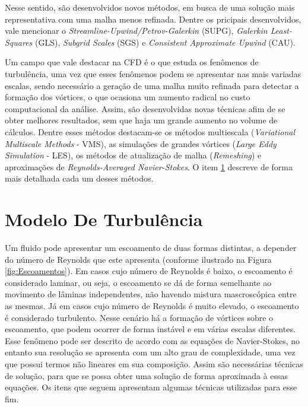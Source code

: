 \documentclass[_ArquivoPrincipal.tex]{subfiles}
\begin{document}
Nesse sentido, são desenvolvidos novos métodos, em busca de uma solução mais representativa com uma malha menos refinada. Dentre os pricipais desenvolvidos, vale mencionar o \textit{Streamline-Upwind/Petrov-Galerkin} (SUPG), \textit{Galerkin Least-Squares} (GLS), \textit{Subgrid Scales} (SGS) e \textit{Consistent Approximate Upwind} (CAU).

Um campo que vale destacar na CFD é o que estuda os fenômenos de turbulência, uma vez que esses fenômenos podem se apresentar nas mais variadas escalas, sendo necessário a geração de uma malha muito refinada para detectar a formação dos vórtices, o que ocasiona um aumento radical no custo computacional da análise. Assim, são desenvolvidas novas técnicas afim de se obter melhores resultados, sem que haja um grande aumento no volume de cálculos. Dentre esses métodos destacam-se os métodos multiescala (\textit{Variational Multiscale Methods} - VMS), as simulações de grandes vórtices (\textit{Large Eddy Simulation} - LES), os métodos de atualização de malha (\textit{Remeshing}) e aproximações de \textit{Reynolds-Averaged Navier-Stokes}. O item \ref{MT} descreve de forma mais detalhada cada um desses métodos.

\section{Modelo De Turbulência} \label{MT}

Um fluido pode apresentar um escoamento de duas formas distintas, a depender do número de Reynolds que este apresenta (conforme ilustrado na Figura \ref{fig:Escoamentos}). Em casos cujo número de Reynolds é baixo, o escoamento é considerado laminar, ou seja, o escoamento se dá de forma semelhante ao movimento de lâminas independentes, não havendo mistura mascroscópica entre as mesmas. Já em casos cujo número de Reynolds é muito elevado, o escoamento é considerado turbulento. Nesse cenário há a formação de vórtices sobre o escoamento, que podem ocorrer de forma instável e em várias escalas diferentes. Esse fenômeno pode ser descrito de acordo com as equações de Navier-Stokes, no entanto sua resolução se apresenta com um alto grau de complexidade, uma vez que possui termos não lineares em sua composição. Assim são necessárias técnicas de solução, para que se possa obter uma solução de forma aproximada à essas equações. Os itens que seguem apresentam algumas técnicas utilizadas para esse fim.
\end{document}
